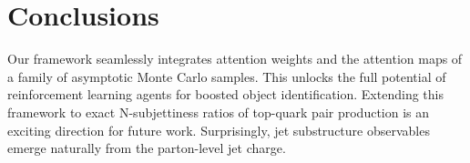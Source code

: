\section{Conclusions}\label{sec:conclusions}

Our framework seamlessly integrates attention weights and the attention
maps of a family of asymptotic Monte Carlo samples. This unlocks the
full potential of reinforcement learning agents for boosted object
identification. Extending this framework to exact N-subjettiness ratios
of top-quark pair production is an exciting direction for future work.
Surprisingly, jet substructure observables emerge naturally from the
parton-level jet charge.

